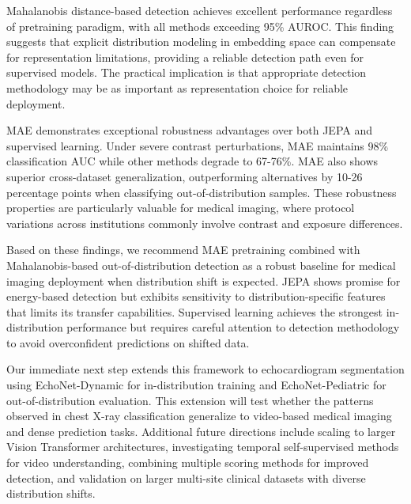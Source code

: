 \documentclass[11pt,a4paper]{article}
\begin{document}
Mahalanobis distance-based detection achieves excellent performance regardless of pretraining paradigm, with all methods exceeding 95\% AUROC. This finding suggests that explicit distribution modeling in embedding space can compensate for representation limitations, providing a reliable detection path even for supervised models. The practical implication is that appropriate detection methodology may be as important as representation choice for reliable deployment.

MAE demonstrates exceptional robustness advantages over both JEPA and supervised learning. Under severe contrast perturbations, MAE maintains 98\% classification AUC while other methods degrade to 67-76\%. MAE also shows superior cross-dataset generalization, outperforming alternatives by 10-26 percentage points when classifying out-of-distribution samples. These robustness properties are particularly valuable for medical imaging, where protocol variations across institutions commonly involve contrast and exposure differences.

Based on these findings, we recommend MAE pretraining combined with Mahalanobis-based out-of-distribution detection as a robust baseline for medical imaging deployment when distribution shift is expected. JEPA shows promise for energy-based detection but exhibits sensitivity to distribution-specific features that limits its transfer capabilities. Supervised learning achieves the strongest in-distribution performance but requires careful attention to detection methodology to avoid overconfident predictions on shifted data.

Our immediate next step extends this framework to echocardiogram segmentation using EchoNet-Dynamic for in-distribution training and EchoNet-Pediatric for out-of-distribution evaluation. This extension will test whether the patterns observed in chest X-ray classification generalize to video-based medical imaging and dense prediction tasks. Additional future directions include scaling to larger Vision Transformer architectures, investigating temporal self-supervised methods for video understanding, combining multiple scoring methods for improved detection, and validation on larger multi-site clinical datasets with diverse distribution shifts.
\end{document}
